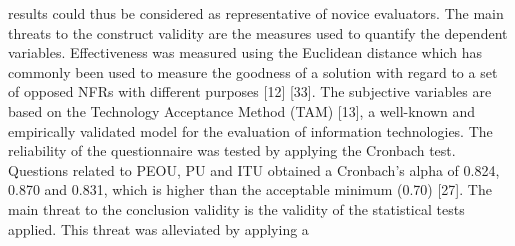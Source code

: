 {results could thus be considered as representative of novice evaluators.
The main threats to the construct validity are the measures used to quantify the
dependent variables. Effectiveness was measured using the Euclidean distance which
has commonly been used to measure the goodness of a solution with regard to a set of
opposed NFRs with different purposes [12] [33]. The subjective variables are based
on the Technology Acceptance Method (TAM) [13], a well-known and empirically
validated model for the evaluation of information technologies. The reliability of the
questionnaire was tested by applying the Cronbach test. Questions related to PEOU,
PU and ITU obtained a Cronbach’s alpha of 0.824, 0.870 and 0.831, which is higher
than the acceptable minimum (0.70) [27]. The main threat to the conclusion validity
is the validity of the statistical tests applied. This threat was alleviated by applying a }